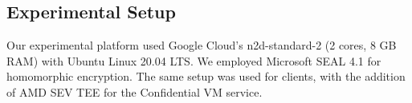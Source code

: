 



\subsection{Experimental Setup}
\label{sec:setup}
Our experimental platform used Google Cloud's n2d-standard-2 (2 cores, 8 GB RAM) with Ubuntu Linux 20.04 LTS. We employed Microsoft SEAL 4.1 \cite{sealcrypto} for homomorphic encryption. The same setup was used for clients, with the addition of AMD SEV TEE for the Confidential VM service.

